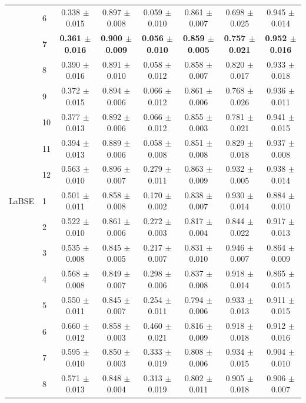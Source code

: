 \begin{longtable}{llcccccc}
 & 6 & 0.338 $\pm$ 0.015 & 0.897 $\pm$ 0.008 & 0.059 $\pm$ 0.010 & 0.861 $\pm$ 0.007 & 0.698 $\pm$ 0.025 & 0.945 $\pm$ 0.014 \\
 & \textbf{7} & \textbf{0.361 $\pm$ 0.016} & \textbf{0.900 $\pm$ 0.009} & \textbf{0.056 $\pm$ 0.010} & \textbf{0.859 $\pm$ 0.005} & \textbf{0.757 $\pm$ 0.021} & \textbf{0.952 $\pm$ 0.016} \\
 & 8 & 0.390 $\pm$ 0.016 & 0.891 $\pm$ 0.010 & 0.058 $\pm$ 0.012 & 0.858 $\pm$ 0.007 & 0.820 $\pm$ 0.017 & 0.933 $\pm$ 0.018 \\
 & 9 & 0.372 $\pm$ 0.015 & 0.894 $\pm$ 0.006 & 0.066 $\pm$ 0.012 & 0.861 $\pm$ 0.006 & 0.768 $\pm$ 0.026 & 0.936 $\pm$ 0.011 \\
 & 10 & 0.377 $\pm$ 0.013 & 0.892 $\pm$ 0.006 & 0.066 $\pm$ 0.012 & 0.855 $\pm$ 0.003 & 0.781 $\pm$ 0.021 & 0.941 $\pm$ 0.015 \\
 & 11 & 0.394 $\pm$ 0.013 & 0.889 $\pm$ 0.006 & 0.058 $\pm$ 0.008 & 0.851 $\pm$ 0.008 & 0.829 $\pm$ 0.018 & 0.937 $\pm$ 0.008 \\
 & 12 & 0.563 $\pm$ 0.010 & 0.896 $\pm$ 0.007 & 0.279 $\pm$ 0.011 & 0.863 $\pm$ 0.009 & 0.932 $\pm$ 0.005 & 0.938 $\pm$ 0.014 \\
\midrule
LaBSE & 1 & 0.501 $\pm$ 0.011 & 0.858 $\pm$ 0.008 & 0.170 $\pm$ 0.002 & 0.838 $\pm$ 0.007 & 0.930 $\pm$ 0.014 & 0.884 $\pm$ 0.010 \\
 & 2 & 0.522 $\pm$ 0.010 & 0.861 $\pm$ 0.006 & 0.272 $\pm$ 0.003 & 0.817 $\pm$ 0.004 & 0.844 $\pm$ 0.022 & 0.917 $\pm$ 0.013 \\
 & 3 & 0.535 $\pm$ 0.008 & 0.845 $\pm$ 0.005 & 0.217 $\pm$ 0.007 & 0.831 $\pm$ 0.010 & 0.946 $\pm$ 0.007 & 0.864 $\pm$ 0.009 \\
 & 4 & 0.568 $\pm$ 0.008 & 0.849 $\pm$ 0.007 & 0.298 $\pm$ 0.006 & 0.837 $\pm$ 0.008 & 0.918 $\pm$ 0.014 & 0.865 $\pm$ 0.015 \\
 & 5 & 0.550 $\pm$ 0.011 & 0.845 $\pm$ 0.007 & 0.254 $\pm$ 0.011 & 0.794 $\pm$ 0.006 & 0.933 $\pm$ 0.013 & 0.911 $\pm$ 0.015 \\
 & 6 & 0.660 $\pm$ 0.012 & 0.858 $\pm$ 0.003 & 0.460 $\pm$ 0.021 & 0.816 $\pm$ 0.009 & 0.918 $\pm$ 0.018 & 0.912 $\pm$ 0.016 \\
 & 7 & 0.595 $\pm$ 0.010 & 0.850 $\pm$ 0.003 & 0.333 $\pm$ 0.019 & 0.808 $\pm$ 0.006 & 0.934 $\pm$ 0.015 & 0.904 $\pm$ 0.010 \\
 & 8 & 0.571 $\pm$ 0.013 & 0.848 $\pm$ 0.004 & 0.313 $\pm$ 0.019 & 0.802 $\pm$ 0.011 & 0.905 $\pm$ 0.018 & 0.906 $\pm$ 0.007 \\

\end{longtable}
